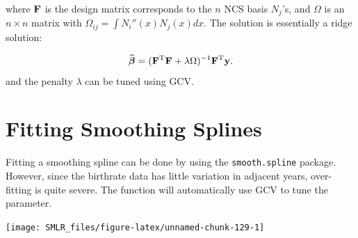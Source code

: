 \documentclass[
]{book}
\newenvironment{Shaded}{\begin{snugshade}}{\end{snugshade}}
\newcommand{\AttributeTok}[1]{\textcolor[rgb]{0.13,0.29,0.53}{#1}}
\newcommand{\CommentTok}[1]{\textcolor[rgb]{0.56,0.35,0.01}{\textit{#1}}}
\newcommand{\DecValTok}[1]{\textcolor[rgb]{0.00,0.00,0.81}{#1}}
\newcommand{\DocumentationTok}[1]{\textcolor[rgb]{0.56,0.35,0.01}{\textbf{\textit{#1}}}}
\newcommand{\FunctionTok}[1]{\textcolor[rgb]{0.13,0.29,0.53}{\textbf{#1}}}
\newcommand{\NormalTok}[1]{#1}
\newcommand{\OtherTok}[1]{\textcolor[rgb]{0.56,0.35,0.01}{#1}}
\newcommand{\SpecialCharTok}[1]{\textcolor[rgb]{0.81,0.36,0.00}{\textbf{#1}}}
\newcommand{\StringTok}[1]{\textcolor[rgb]{0.31,0.60,0.02}{#1}}
\def\bF{{\bf F}}
\theoremstyle{definition}
\theoremstyle{definition}
\theoremstyle{definition}
\theoremstyle{definition}
\theoremstyle{remark}
\begin{document}
where \(\bF\) is the design matrix corresponds to the \(n\) NCS basis \(N_j\)'s, and \(\Omega\) is an \(n \times n\) matrix with \(\Omega_{ij} = \int N_i''(x) N_j(x) dx.\) The solution is essentially a ridge solution:

\[\widehat{\boldsymbol \beta} = (\bF^\text{T}\bF + \lambda \Omega)^{-1} \bF^\text{T}\mathbf{y}.\]
and the penalty \(\lambda\) can be tuned using GCV.

\hypertarget{fitting-smoothing-splines}{%
\section{Fitting Smoothing Splines}\label{fitting-smoothing-splines}}

Fitting a smoothing spline can be done by using the \texttt{smooth.spline} package. However, since the birthrate data has little variation in adjacent years, over-fitting is quite severe. The function will automatically use GCV to tune the parameter.

\begin{Shaded}
\end{Shaded}

\begin{center}\texttt{[image: SMLR\_files/figure-latex/unnamed-chunk-129-1]} \end{center}

\begin{Shaded}
\end{Shaded}
\end{document}
